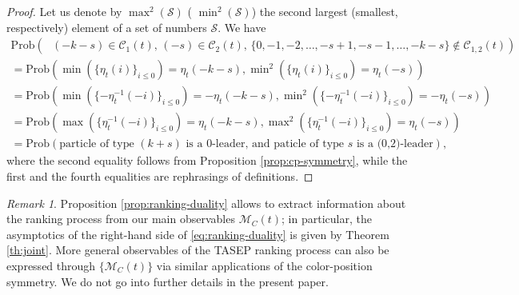 \documentclass[11pt,reqno]{amsart}
\theoremstyle{definition}
\theoremstyle{remark}
\newtheorem{rmk}[thm]{Remark}
\theoremstyle{remark}
\def\leq{\leqslant}
\renewcommand\le{\leq}
\def\M{\mathcal M}
\numberwithin{equation}{section}
\begin{document}
	\begin{proof}
		
		Let us denote by $\max^2 (\mathcal{S})$ ( $\min^2 (\mathcal{S})$) the second largest (smallest, respectively) element of a set of numbers $\mathcal{S}$. We have
		\begin{multline*}
			\mathrm{Prob} \left(\mbox{ $(-k-s) \in \mathcal{C}_1 (t)$, $(-s) \in \mathcal{C}_2 (t)$, $\{ 0, -1, -2, \dots, -s+1, -s-1, \dots, -k-s \} \notin \mathcal{C}_{1,2} (t)$} \right) 
			\\ =
			\mathrm{Prob} \left(\min \left( \{ \eta_t (i) \}_{i \le 0} \right) = \eta_t (-k-s), \min\nolimits^2 \left( \{ \eta_t (i) \}_{i \le 0} \right) = \eta_t (-s) \right) 
			\\ = \mathrm{Prob} \left(\min\nolimits \left( \{ -\eta_t^{-1} (-i) \}_{i \le 0} \right) = - \eta_t (-k-s), \min\nolimits^2 \left( \{ -\eta_t^{-1} (-i) \}_{i \le 0} \right) = - \eta_t (-s) \right)
			\\ = \mathrm{Prob} \left(\max\nolimits \left( \{ \eta_t^{-1} (-i) \}_{i \le 0} \right) = \eta_t (-k-s), \max\nolimits^2 \left( \{ \eta_t^{-1} (-i) \}_{i \le 0} \right) = \eta_t (-s) \right)
			\\ = \mathrm{Prob} \left( \mbox{particle of type $(k+s)$ is a 0-leader, and paticle of type $s$ is a (0,2)-leader} \right),
		\end{multline*}
		where the second equality follows from Proposition \ref{prop:cp-symmetry}, while the first and the fourth equalities are rephrasings of definitions. 
	\end{proof}
	
	\begin{rmk}
		Proposition \ref{prop:ranking-duality} allows to extract information about the ranking process from our main observables $\M_C(t)$; in particular, the asymptotics of the right-hand side of \eqref{eq:ranking-duality} is given by Theorem \ref{th:joint}. More general observables of the TASEP ranking process can also be expressed through $\{ \M_C(t) \}$ via similar applications of the color-position symmetry. We do not go into further details in the present paper. 
	\end{rmk}
	
\end{document}
